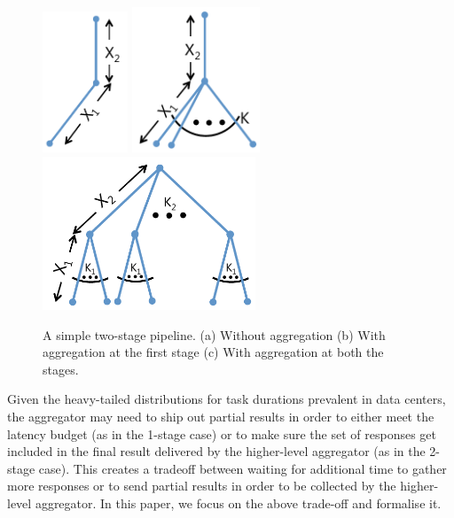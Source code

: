 \documentclass[letterpaper,twocolumn,10pt]{article}
\begin{document}
\begin{figure}[t]
  \centering
  \subfloat
  {
    \includegraphics[width=1in]{Figures/2Stage.pdf}
    \label{figure:2StageSimple}
  }
  \hspace{0.5in}
  \subfloat
  {
    \includegraphics[width=1.5in]{Figures/2StageAggregation.pdf}
    \label{figure:2StageAggregation}
  }
  \hspace{0.5in}
    \subfloat
  {
    \includegraphics[width=2.5in]{Figures/2StageAggregationFull.pdf}
    \label{figure:2StageAggregationFull}
  }
    \caption{A simple two-stage pipeline. (a) Without aggregation (b) With aggregation at the first stage (c) With aggregation at both the stages.}
  \label{figure:2Stage}
\end{figure}

Given the heavy-tailed distributions for task durations prevalent in data centers, 
the aggregator may need to ship out partial results in order to either meet the latency budget
(as in the 1-stage case) or to make sure the set of responses get included in the final result 
delivered by the higher-level aggregator (as in the 2-stage case). This creates a tradeoff between waiting for additional time to gather more responses or to send partial results in order to be collected by the higher-level aggregator. In this paper, we focus on the above trade-off and formalise it.
\end{document}
